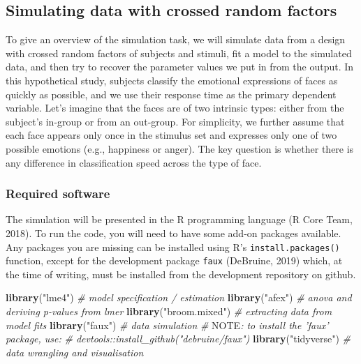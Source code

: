 \documentclass[man,floatsintext]{apa6}
\newenvironment{Shaded}{\begin{snugshade}}{\end{snugshade}}
\newcommand{\KeywordTok}[1]{\textcolor[rgb]{0.13,0.29,0.53}{\textbf{#1}}}
\newcommand{\StringTok}[1]{\textcolor[rgb]{0.31,0.60,0.02}{#1}}
\newcommand{\CommentTok}[1]{\textcolor[rgb]{0.56,0.35,0.01}{\textit{#1}}}
\newcommand{\AlertTok}[1]{\textcolor[rgb]{0.94,0.16,0.16}{#1}}
\newcommand{\NormalTok}[1]{#1}
\begin{document}
\subsection{Simulating data with crossed random
factors}\label{simulating-data-with-crossed-random-factors}

To give an overview of the simulation task, we will simulate data from a
design with crossed random factors of subjects and stimuli, fit a model
to the simulated data, and then try to recover the parameter values we
put in from the output. In this hypothetical study, subjects classify
the emotional expressions of faces as quickly as possible, and we use
their response time as the primary dependent variable. Let's imagine
that the faces are of two intrinsic types: either from the subject's
in-group or from an out-group. For simplicity, we further assume that
each face appears only once in the stimulus set and expresses only one
of two possible emotions (e.g., happiness or anger). The key question is
whether there is any difference in classification speed across the type
of face.

\subsubsection{Required software}\label{required-software}

The simulation will be presented in the R programming language (R Core
Team, 2018). To run the code, you will need to have some add-on packages
available. Any packages you are missing can be installed using R's
\texttt{install.packages()} function, except for the development package
\texttt{faux} (DeBruine, 2019) which, at the time of writing, must be
installed from the development repository on github.

\begin{Shaded}
\begin{Highlighting}[]
\KeywordTok{library}\NormalTok{(}\StringTok{"lme4"}\NormalTok{)        }\CommentTok{# model specification / estimation}
\KeywordTok{library}\NormalTok{(}\StringTok{"afex"}\NormalTok{)        }\CommentTok{# anova and deriving p-values from lmer}
\KeywordTok{library}\NormalTok{(}\StringTok{"broom.mixed"}\NormalTok{) }\CommentTok{# extracting data from model fits }
\KeywordTok{library}\NormalTok{(}\StringTok{"faux"}\NormalTok{)        }\CommentTok{# data simulation}
\CommentTok{# }\AlertTok{NOTE}\CommentTok{: to install the 'faux' package, use:}
\CommentTok{# devtools::install_github("debruine/faux")}
\KeywordTok{library}\NormalTok{(}\StringTok{"tidyverse"}\NormalTok{)   }\CommentTok{# data wrangling and visualisation}
\end{Highlighting}
\end{Shaded}
\end{document}
